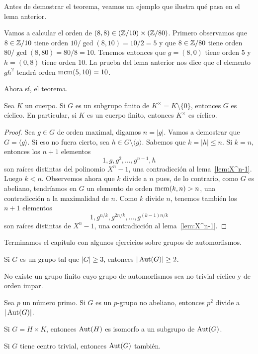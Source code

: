 Antes de demostrar el teorema, veamos un ejemplo que ilustra qué pasa en el lema anterior.

\begin{example}
Vamos a calcular el orden de $(8,8)\in(\mathbb{Z}/10)\times(\mathbb{Z}/80)$. Primero observamos que 
$8\in\mathbb{Z}/10$ tiene orden $10/\gcd(8,10)=10/2=5$ y que $8\in\mathbb{Z}/80$ tiene orden
$80/\gcd(8,80)=80/8=10$. Tenemos entonces que $g=(8,0)$ tiene orden 5 y $h=(0,8)$ tiene orden 10. La prueba del lema anterior nos dice que
el elemento $gh^2$ tendrá orden $\operatorname{mcm}(5,10)=10$.   
\end{example}

Ahora sí, el teorema. 

\begin{theorem}
Sea $K$ un cuerpo. Si $G$ es un subgrupo finito de $K^\times=K\setminus\{0\}$, entonces $G$ es cíclico. En particular, si $K$ es un cuerpo finito, entonces $K^\times$ es cíclico.  
\end{theorem}

\begin{proof}
Sea $g\in G$ de orden maximal, digamos $n=|g|$. Vamos a demostrar que $G=\langle g\rangle$. Si eso no fuera cierto, 
sea $h\in G\setminus\langle g\rangle$. Sabemos que $k=|h|\leq n$. Si $k=n$, entonces los $n+1$ elementos
\[
1,g,g^2,\dots,g^{n-1},h
\]
son raíces distintas del polinomio $X^n-1$, una contradicción al lema~\ref{lem:X^n-1}.  
Luego $k<n$. Observemos ahora que $k$ divide a $n$ pues, de lo contrario, 
como $G$ es abeliano, tendríamos en $G$ un elemento de orden 
$\operatorname{mcm}(k,n)>n$, una contradicción a la maximalidad de $n$. Como $k$ divide $n$, tenemos 
también los $n+1$ elementos 
\[
1,g^{n/k},g^{2n/k},\dots,g^{(k-1)n/k}
\]
son raíces distintas de $X^n-1$, una contradicción al lema~\ref{lem:X^n-1}. 
\end{proof}

Terminamos el capítulo con algunos ejercicios sobre grupos de automorfismos.

\begin{exercise}
\label{xca:autgeq2}
	Si $G$ es un grupo tal que $|G|\geq3$, entonces $|\operatorname{Aut}(G)|\geq2$. 	
\end{exercise}


\begin{exercise}
\label{xca:aut_impar}
	No existe un grupo finito cuyo grupo de automorfismos sea no trivial cíclico y de orden impar.	
\end{exercise}

\begin{exercise}
\label{xca:p2dividesAut}
	Sea $p$ un número primo.
	Si $G$ es un $p$-grupo no abeliano, entonces $p^2$ divide a $|\operatorname{Aut}(G)|$. 	
\end{exercise}

\begin{exercise}
	\label{xca:Aut(H)}
	Si $G=H\times K$, entonces $\operatorname{Aut}(H)$ es isomorfo a un subgrupo de $\operatorname{Aut}(G)$. 	
\end{exercise}

\begin{exercise}
\label{xca:aut_trivial_center}
	Si $G$ tiene centro trivial, entonces $\operatorname{Aut}(G)$ también. 	
\end{exercise}





